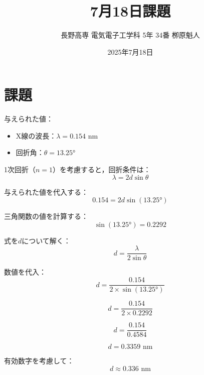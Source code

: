 \documentclass[11pt,a4paper]{ltjsarticle} %
\begin{document}
\title{7月18日課題}
\author{長野高専 電気電子工学科 5年 34番 栁原魁人}
\date{2025年7月18日}
\maketitle
\thispagestyle{fancy}

\section{課題}

与えられた値：
\begin{itemize}
\item X線の波長：$\lambda = 0.154$ nm
\item 回折角：$\theta = 13.25°$
\end{itemize}


1次回折（$n=1$）を考慮すると，回折条件は：
$$\lambda = 2d\sin\theta$$

与えられた値を代入する：
$$0.154 = 2d\sin(13.25°)$$

三角関数の値を計算する：
$$\sin(13.25°) = 0.2292$$

式を$d$について解く：
$$d = \frac{\lambda}{2\sin\theta}$$

数値を代入：
$$d = \frac{0.154}{2 \times \sin(13.25°)}$$

$$d = \frac{0.154}{2 \times 0.2292}$$

$$d = \frac{0.154}{0.4584}$$

$$d = 0.3359 \text{ nm}$$

有効数字を考慮して：
$$d \approx 0.336 \text{ nm}$$
\end{document}
